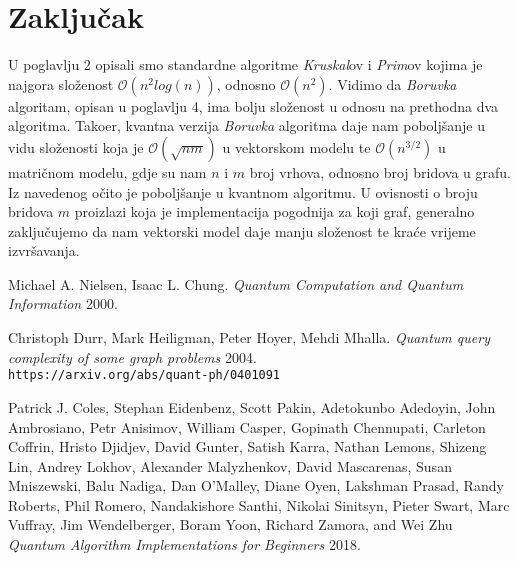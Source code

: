 \documentclass[a4paper,12pt]{article}
\begin{document}
\newpage
\section{Zaklju\v{c}ak}

U poglavlju 2 opisali smo standardne algoritme \emph{Kruskal}ov i \emph{Prim}ov kojima je najgora slo\v{z}enost $ \mathcal{O} (n^2log(n))$, odnosno $ \mathcal{O} (n^2)$. Vidimo da \emph{Boruvka} algoritam, opisan u poglavlju 4, ima bolju slo\v{z}enost u odnosu na prethodna dva algoritma. Tako\dj{}er, kvantna verzija \emph{Boruvka} algoritma daje nam pobolj\v{s}anje u vidu slo\v{z}enosti koja je $ \mathcal{O} ( \sqrt{nm} )$ u vektorskom modelu te $ \mathcal{O} (n^{3/2})$ u matri\v{c}nom modelu, gdje su nam $n$ i $m$ broj vrhova, odnosno broj bridova u grafu. Iz navedenog o\v{c}ito je pobolj\v{s}anje u kvantnom algoritmu. U ovisnosti o broju bridova $m$ proizlazi koja je implementacija pogodnija za koji graf, generalno zaklju\v{c}ujemo da nam vektorski model daje manju slo\v{z}enost te kra\'ce vrijeme izvr\v{s}avanja. 

\newpage
\begin{thebibliography}{9}

	Michael A. Nielsen, Isaac L. Chung.
	\textit{Quantum Computation and Quantum Information}
	2000.	
	
	Christoph Durr, Mark Heiligman, Peter Hoyer, Mehdi Mhalla. 
	\textit{Quantum query complexity of some graph problems}
	2004.
	\\\texttt{https://arxiv.org/abs/quant-ph/0401091}
	
	Patrick J. Coles, Stephan Eidenbenz, Scott Pakin, Adetokunbo Adedoyin, John Ambrosiano, Petr Anisimov, William Casper, Gopinath Chennupati, Carleton Coffrin, Hristo Djidjev, David Gunter, Satish Karra, Nathan Lemons, Shizeng Lin, Andrey Lokhov, Alexander Malyzhenkov, David Mascarenas, Susan Mniszewski, Balu Nadiga, Dan O'Malley, Diane Oyen, Lakshman Prasad, Randy Roberts, Phil Romero, Nandakishore Santhi, Nikolai Sinitsyn, Pieter Swart, Marc Vuffray, Jim Wendelberger, Boram Yoon, Richard Zamora, and Wei Zhu
	\textit{Quantum Algorithm Implementations for Beginners}
	2018.	
	
\end{thebibliography}
\end{document}
